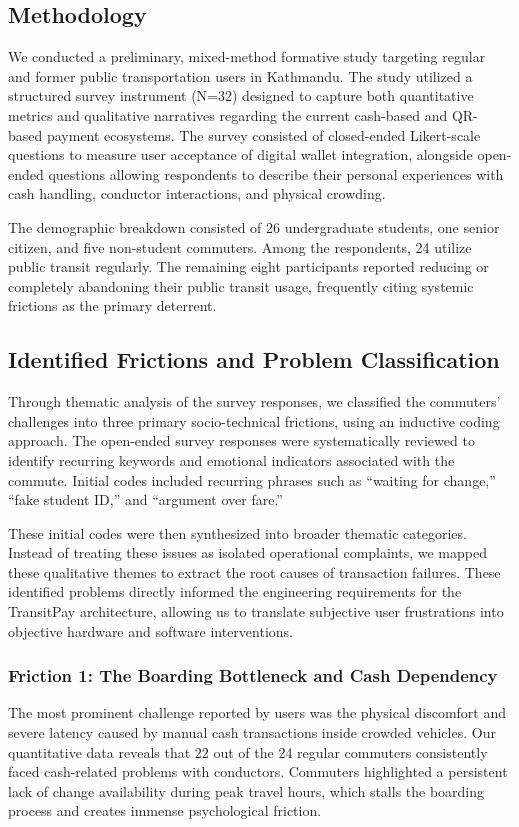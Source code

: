 \documentclass[manuscript,review,anonymous]{acmart}
\begin{document}
\subsection{Methodology}

We conducted a preliminary, mixed-method formative study targeting regular and former public transportation users in Kathmandu. The study utilized a structured survey instrument (N=32) designed to capture both quantitative metrics and qualitative narratives regarding the current cash-based and QR-based payment ecosystems. The survey consisted of closed-ended Likert-scale questions to measure user acceptance of digital wallet integration, alongside open-ended questions allowing respondents to describe their personal experiences with cash handling, conductor interactions, and physical crowding.

The demographic breakdown consisted of 26 undergraduate students, one senior citizen, and five non-student commuters. Among the respondents, 24 utilize public transit regularly. The remaining eight participants reported reducing or completely abandoning their public transit usage, frequently citing systemic frictions as the primary deterrent.

\subsection{Identified Frictions and Problem Classification}
Through thematic analysis of the survey responses, we classified the commuters' challenges into three primary socio-technical frictions, using an inductive coding approach. The open-ended survey responses were systematically reviewed to identify recurring keywords and emotional indicators associated with the commute. Initial codes included recurring phrases such as ``waiting for change,'' ``fake student ID,'' and ``argument over fare.''

These initial codes were then synthesized into broader thematic categories. Instead of treating these issues as isolated operational complaints, we mapped these qualitative themes to extract the root causes of transaction failures. These identified problems directly informed the engineering requirements for the TransitPay architecture, allowing us to translate subjective user frustrations into objective hardware and software interventions.

\subsubsection{Friction 1: The Boarding Bottleneck and Cash Dependency}
The most prominent challenge reported by users was the physical discomfort and severe latency caused by manual cash transactions inside crowded vehicles. Our quantitative data reveals that 22 out of the 24 regular commuters consistently faced cash-related problems with conductors. Commuters highlighted a persistent lack of change availability during peak travel hours, which stalls the boarding process and creates immense psychological friction.
\end{document}
